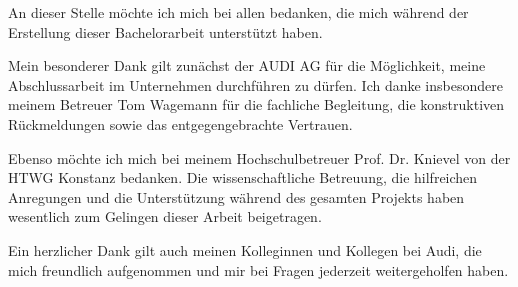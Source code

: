 \documentclass[
11pt, %
ngerman, %
singlespacing, %
headsepline, %
]{MastersDoctoralThesis} %
\begin{document}
\cleardoublepage



\begin{acknowledgements}
\addchaptertocentry{\acknowledgementname} %
An dieser Stelle möchte ich mich bei allen bedanken, die mich während der Erstellung dieser Bachelorarbeit unterstützt haben.

Mein besonderer Dank gilt zunächst der AUDI AG für die Möglichkeit, meine Abschlussarbeit im Unternehmen durchführen zu dürfen. Ich danke insbesondere meinem Betreuer Tom Wagemann für die fachliche Begleitung, die konstruktiven Rückmeldungen sowie das entgegengebrachte Vertrauen.

Ebenso möchte ich mich bei meinem Hochschulbetreuer Prof. Dr. Knievel von der HTWG Konstanz bedanken. Die wissenschaftliche Betreuung, die hilfreichen Anregungen und die Unterstützung während des gesamten Projekts haben wesentlich zum Gelingen dieser Arbeit beigetragen.

Ein herzlicher Dank gilt auch meinen Kolleginnen und Kollegen bei Audi, die mich freundlich aufgenommen und mir bei Fragen jederzeit weitergeholfen haben.

\end{acknowledgements}


\tableofcontents %

\listoffigures %

\listoftables %

\end{document}
